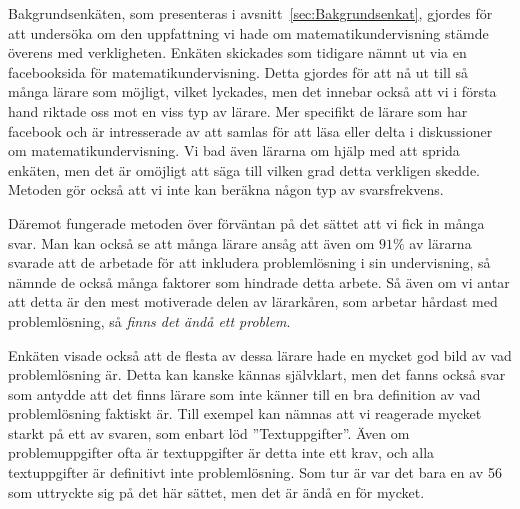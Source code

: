 \textcolor{lila}{Bakgrundsenkäten, som presenteras i avsnitt~\ref{sec:Bakgrundsenkat}, gjordes för att undersöka om den uppfattning vi hade om matematikundervisning stämde överens med verkligheten. Enkäten skickades som tidigare nämnt ut via en facebooksida för matematikundervisning. Detta gjordes för att nå ut till så många lärare som möjligt, vilket lyckades, men det innebar också att vi i första hand riktade oss mot en viss typ av lärare. Mer specifikt de lärare som har facebook och är intresserade av att samlas för att läsa eller delta i diskussioner om matematikundervisning. Vi bad även lärarna om hjälp med att sprida enkäten, men det är omöjligt att säga till vilken grad detta verkligen skedde. Metoden gör också att vi inte kan beräkna någon typ av svarsfrekvens.}

\textcolor{lila}{Däremot fungerade metoden över förväntan på det sättet att vi fick in många svar. Man kan också se att många lärare ansåg att även om $91\%$ av lärarna svarade att de arbetade för att inkludera problemlösning i sin undervisning, så nämnde de också många faktorer som hindrade detta arbete. Så även om vi antar att detta är den mest motiverade delen av lärarkåren, som arbetar hårdast med problemlösning, så \textsl{finns det ändå ett problem}.}

\textcolor{lila}{Enkäten visade också att de flesta av dessa lärare hade en mycket god bild av vad problemlösning är. Detta kan kanske kännas självklart, men det fanns också svar som antydde att det finns lärare som inte känner till en bra definition av vad problemlösning faktiskt är. Till exempel kan nämnas att vi reagerade mycket starkt på ett av svaren, som enbart löd ''Textuppgifter''. Även om problemuppgifter ofta är textuppgifter är detta inte ett krav, och alla textuppgifter är definitivt inte problemlösning. Som tur är var det bara en av 56 som uttryckte sig på det här sättet, men det är ändå en för mycket.}

